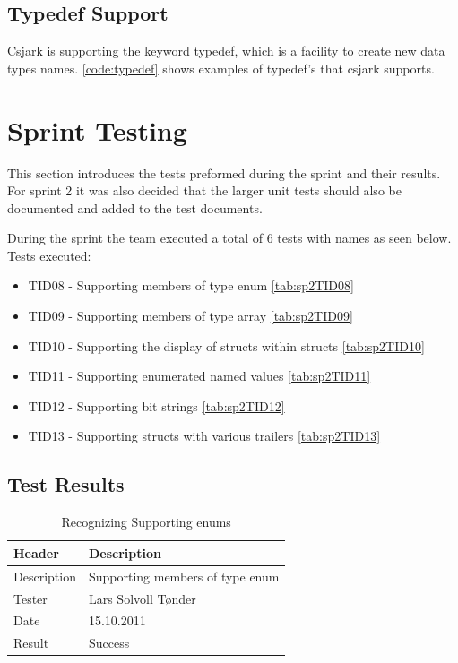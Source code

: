



\subsection{Typedef Support}
Csjark is supporting the keyword typedef, which is a facility to create new 
data types names. \autoref{code:typedef} shows examples of typedef's that 
csjark supports.



\section{Sprint Testing}
This section introduces the tests preformed during the sprint and their results. For sprint 2 it was also decided that the larger unit tests should also be documented and added to the test documents.

During the sprint the team executed a total of 6 tests with names as seen below. Tests executed:
\begin{itemize}
	\item TID08 - Supporting members of type enum \autoref{tab:sp2TID08}
	\item TID09 - Supporting members of type array  \autoref{tab:sp2TID09}
	\item TID10 - Supporting the display of structs within structs  \autoref{tab:sp2TID10}
	\item TID11 - Supporting enumerated named values  \autoref{tab:sp2TID11}
	\item TID12 - Supporting bit strings  \autoref{tab:sp2TID12}
	\item TID13 - Supporting structs with various trailers \autoref{tab:sp2TID13}
\end{itemize}

\subsection{Test Results}
\begin{table}[!htb] \footnotesize \center
\caption{Recognizing Supporting enums \label{tab:sp2TID08}}
\begin{tabular}{l l}
	\toprule
	Header & Description \\
	\midrule
	Description &  Supporting members of type enum  \\
	Tester & Lars Solvoll Tønder \\
	Date & 15.10.2011 \\
	Result & Success\\
	\bottomrule
\end{tabular}
\end{table}

